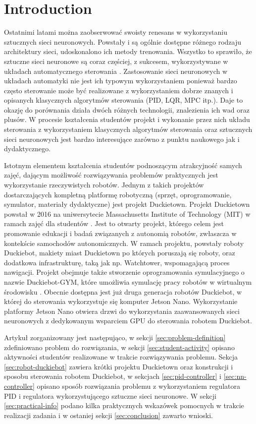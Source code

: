 \documentclass[conference]{IEEEtran}
\begin{document}
\section{Introduction}
Ostatnimi latami można zaobserwować swoisty renesans w wykorzystaniu sztucznych sieci neuronowych. Powstały i są ogólnie dostępne różnego rodzaju architektury sieci, udoskonalono ich metody trenowania. Wszystko to sprawiło, że  sztuczne sieci neuronowe są coraz częściej, z sukcesem, wykorzystywane w układach automatycznego sterowania \cite{algor2030973, 786109}. Zastosowanie sieci neuronowych w układach automatyki nie jest ich typowym wykorzystaniem ponieważ bardzo często sterowanie może być realizowane z wykorzystaniem dobrze znanych i opisanych klasycznych algorytmów sterowania (PID, LQR, MPC itp.). Daje to okazję do porównania działa dwóch różnych technologii, znalezienia ich wad oraz plusów. W procesie kształcenia studentów projekt i wykonanie przez nich układu sterowania z wykorzystaniem klasycznych algorytmów sterowania oraz sztucznych sieci neuronowych jest bardzo interesujące zarówno z punktu naukowego jak i dydaktycznego.

Istotnym elementem kształcenia studentów podnoszącym atrakcyjność samych zajęć, dającym możliwość rozwiązywania problemów praktycznych jest wykorzystanie rzeczywistych robotów. Jednym z takich projektów dostarczających kompletną platformę robotyczną (sprzęt, oprogramowanie, symulator, materiały dydaktyczne) jest projekt Duckietown.
Projekt Duckietown powstał w 2016 na uniwersytecie Massachusetts Institute of Technology (MIT) w ramach zajęć dla studentów \cite{paull2017duckietown}. Jest to otwarty projekt, którego celem jest promowanie edukacji i badań związanych z autonomią robotów, zwłaszcza w kontekście samochodów autonomicznych. W ramach projektu, powstały roboty Duckiebot, makiety miast Duckietown po których poruszają się roboty, oraz dodatkowa infrastrukturę, taką jak np. Watchtower, wspomagającą proces nawigacji. 
Projekt obejmuje także stworzenie oprogramowania symulacyjnego o nazwie Duckiebot-GYM, które umożliwia symulację pracy robotów w wirtualnym środowisku \cite{gym_duckietown}. Obecnie dostępna jest już druga generacja robotów Duckiebot, w której do sterowania wykorzystuje się komputer Jetson Nano. Wykorzystanie platformy Jetson Nano otwiera drzwi do wykorzystania zaawansowanych sieci neuronowych z dedykowanym wsparciem GPU do sterowania robotem Duckiebot.

Artykuł zorganizowany jest następująco, w sekcji \ref{sec:problem-definition} zdefiniowano problem do rozwiązania, w sekcji \ref{sec:student-activity} opisano aktywności studentów realizowane w trakcie rozwiązywania  problemu. Sekcja \ref{sec:robot-duckiebot} zawiera krótki projektu Duckietown oraz konstrukcji i sposobu sterowania robotem Duckiebot, w sekcjach \ref{sec:pid-controller} i \ref{sec:nn-controller} opisano sposób rozwiązania problemu z wykorzystaniem regulatora PID i regulatora wykorzystującego sztuczne sieci neuronowe. W sekcji \ref{sec:practical-info} podano kilka praktycznych wskazówek pomocnych w trakcie realizacji zadania i w ostaniej sekcji \ref{sec:conclusion} zawarto wnioski.
\end{document}
